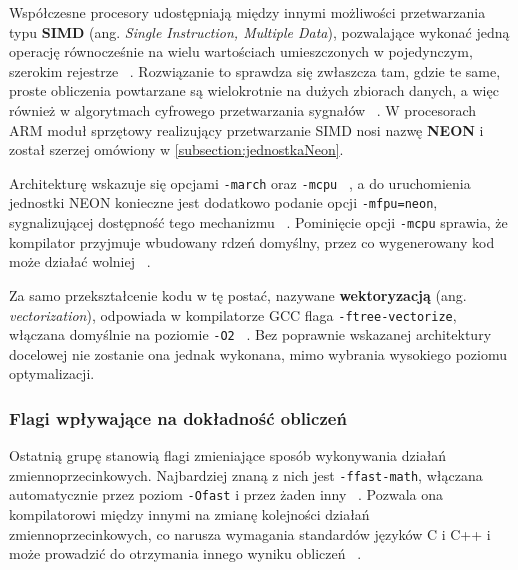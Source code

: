 Współczesne procesory udostępniają między innymi możliwości przetwarzania typu \textbf{SIMD} (ang. \textit{Single Instruction, Multiple Data}), pozwalające wykonać jedną operację równocześnie na wielu wartościach umieszczonych w pojedynczym, szerokim rejestrze ~\cite{ArmNeonGuide}. Rozwiązanie to sprawdza się zwłaszcza tam, gdzie te same, proste obliczenia powtarzane są wielokrotnie na dużych zbiorach danych, a więc również w algorytmach cyfrowego przetwarzania sygnałów ~\cite{ArmNeonGuide}. W procesorach ARM moduł sprzętowy realizujący przetwarzanie SIMD nosi nazwę \textbf{NEON} i został szerzej omówiony w \cref{subsection:jednostkaNeon}.

Architekturę wskazuje się opcjami \texttt{-march} oraz \texttt{-mcpu} ~\cite{ArmNeonGuide}, a do uruchomienia jednostki NEON konieczne jest dodatkowo podanie opcji \texttt{-mfpu=neon}, sygnalizującej dostępność tego mechanizmu ~\cite{ArmNeonGuide}. Pominięcie opcji \texttt{-mcpu} sprawia, że kompilator przyjmuje wbudowany rdzeń domyślny, przez co wygenerowany kod może działać wolniej ~\cite{ArmNeonGuide}.

Za samo przekształcenie kodu w tę postać, nazywane \textbf{wektoryzacją} (ang. \textit{vectorization}), odpowiada w kompilatorze GCC flaga \texttt{-ftree-vectorize}, włączana domyślnie na poziomie \texttt{-O2} ~\cite{gcc_optlevels}. Bez poprawnie wskazanej architektury docelowej nie zostanie ona jednak wykonana, mimo wybrania wysokiego poziomu optymalizacji.

\subsubsection{Flagi wpływające na dokładność obliczeń}

Ostatnią grupę stanowią flagi zmieniające sposób wykonywania działań zmiennoprzecinkowych. Najbardziej znaną z nich jest \texttt{-ffast-math}, włączana automatycznie przez poziom \texttt{-Ofast} i przez żaden inny ~\cite{gcc_optlevels}. Pozwala ona kompilatorowi między innymi na zmianę kolejności działań zmiennoprzecinkowych, co narusza wymagania standardów języków C i C++ i może prowadzić do otrzymania innego wyniku obliczeń ~\cite{gcc_optlevels}.

